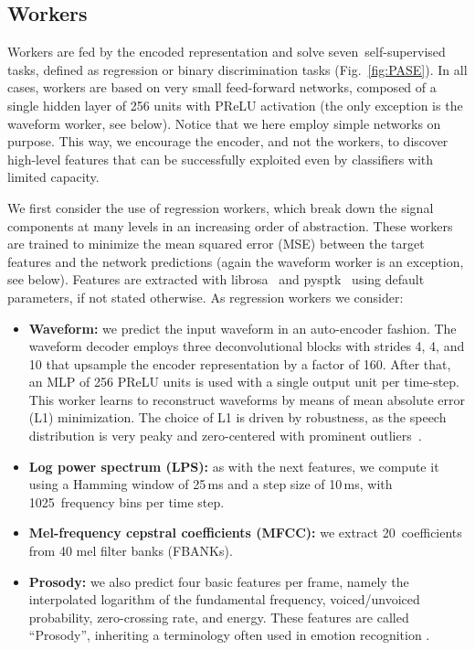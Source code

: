 \documentclass[a4paper]{article}
\begin{document}
\subsection{Workers}
\label{sec:unsupervised_training}


Workers are fed by the encoded representation and solve seven~self-supervised tasks, defined as regression or binary discrimination tasks (Fig.~\ref{fig:PASE}). In all cases, workers are based on very small feed-forward networks, composed of a single hidden layer of 256 units with PReLU activation (the only exception is the waveform worker, see below). Notice that we here employ simple networks on purpose. This way, we encourage the encoder, and not the workers, to discover high-level features that can be successfully exploited even by classifiers with limited capacity. 



 
We first consider the use of regression workers, which break down the signal components at many levels in an increasing order of abstraction. These workers are trained to minimize the mean squared error (MSE) between the target features and the network predictions (again the waveform worker is an exception, see below). Features are extracted with librosa~\cite{brian_mcfee_2019_2564164} and pysptk~\cite{pysptk} using default parameters, if not stated otherwise. As regression workers we consider:

\begin{itemize}
    \item \textbf{Waveform:} we predict the input waveform in an auto-encoder fashion. The waveform decoder employs three deconvolutional blocks with strides 4, 4, and 10 that upsample the encoder representation by a factor of 160.  After that, an MLP of 256 PReLU units is used with a single output unit per time-step.
    This worker learns to reconstruct waveforms by means of mean absolute error (L1) minimization. The choice of L1 is driven by robustness, as the speech distribution is very peaky and zero-centered with prominent outliers~\cite{pascual2017segan}.
    \item \textbf{Log power spectrum (LPS):} as with the next features, we compute it using a Hamming window of 25\,ms and a step size of 10\,ms, with 1025~frequency bins per time step.
    \item \textbf{Mel-frequency cepstral coefficients (MFCC):} we extract 20~coefficients from 40 mel filter banks (FBANKs). \item \textbf{Prosody:} we also predict four basic  features per frame, namely the interpolated logarithm of the fundamental frequency, voiced/unvoiced probability, zero-crossing rate, and energy. These features are called  ``Prosody'', inheriting a terminology often used in emotion recognition \cite{emotion1,emotion2}. \end{itemize}
\end{document}
